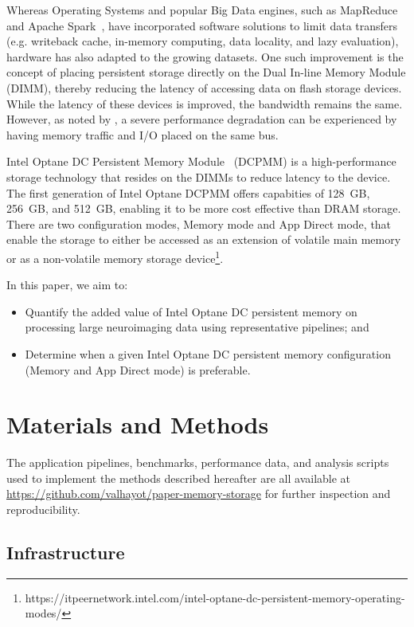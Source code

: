 \documentclass[conference]{IEEEtran}
\begin{document}
Whereas Operating Systems and popular Big Data engines, such as MapReduce~\cite{mapreduce} and Apache Spark~\cite{spark}, have
incorporated software solutions to limit data transfers (e.g. writeback cache, in-memory computing,
data locality, and lazy evaluation), hardware has also adapted to the growing datasets.
One such improvement is the concept of placing persistent storage directly on the Dual
In-line Memory Module (DIMM), thereby reducing the latency of accessing data on 
flash storage devices. While the latency of these devices is improved, the bandwidth
remains the same. However, as noted by \cite{nvdimms}, a severe performance degradation
can be experienced by having memory traffic and I/O placed on the same bus.


Intel Optane DC Persistent Memory Module~\cite{optanebrief} (DCPMM) is a high-performance
storage technology that resides on the DIMMs to reduce latency to the device.
The first generation of Intel Optane DCPMM offers capabities of 128~GB,
256~GB, and 512~GB, enabling it to be more cost effective than DRAM storage.
There are two configuration modes, Memory mode and App Direct mode,
that enable the storage to either be accessed as an extension of volatile main memory
or as a non-volatile memory storage device\footnote{https://itpeernetwork.intel.com/intel-optane-dc-persistent-memory-operating-modes/}.


In this paper, we aim to:
\begin{itemize}
        \item Quantify the added value of Intel Optane DC persistent memory on 
            processing large neuroimaging data using representative pipelines; and
        \item Determine when a given Intel Optane DC persistent memory configuration (Memory 
            and App Direct mode) is preferable.
\end{itemize}

\section{Materials and Methods}
The application pipelines, benchmarks, performance data, and analysis scripts used 
to implement the methods described hereafter are all available at 
\url{https://github.com/valhayot/paper-memory-storage} for 
further inspection and reproducibility.

\subsection{Infrastructure}
\end{document}
